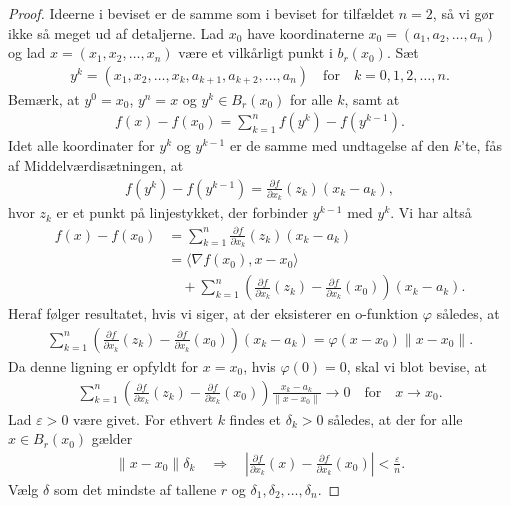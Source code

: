 \begin{proof}
  Ideerne i beviset er de samme som i beviset for tilfældet $n = 2$, så vi gør ikke så meget ud af detaljerne. Lad $x_0$ have koordinaterne $x_0 = (a_1, a_2, \ldots, a_n)$ og lad $x = (x_1, x_2, \ldots, x_n)$ være et vilkårligt punkt i $b_r(x_0)$. Sæt
  \begin{align*}
    y^k = (x_1, x_2, \ldots, x_k, a_{k + 1}, a_{k + 2}, \ldots, a_n)
    \quad \text{for} \quad k = 0, 1, 2, \ldots, n.
  \end{align*}
  Bemærk, at $y^0 = x_0$, $y^n = x$ og $y^k \in B_r(x_0)$ for alle $k$, samt at
  \begin{align*}
    f(x) - f(x_0) = \sum_{k = 1}^n f(y^k) - f(y^{k - 1}).
  \end{align*}
  Idet alle koordinater for $y^k$ og $y^{k - 1}$ er de samme med undtagelse af den $k$'te, fås af Middelværdisætningen, at
  \begin{align*}
    f(y^k) - f(y^{k - 1}) = \frac{\partial f}{\partial x_k}(z_k)(x_k - a_k),
  \end{align*}
  hvor $z_k$ er et punkt på linjestykket, der forbinder $y^{k - 1}$ med $y^k$. Vi har altså
  \begin{align*}
    f(x) - f(x_0) &= \sum_{k = 1}^n \frac{\partial f}{\partial x_k}(z_k)(x_k - a_k) \\
    &= \langle \nabla f(x_0), x - x_0 \rangle\\
    &\quad + \sum_{k = 1}^n \left( \frac{\partial f}{\partial x_k}(z_k) - \frac{\partial f}{\partial x_k}(x_0) \right) (x_k - a_k).
   \end{align*}
   Heraf følger resultatet, hvis vi siger, at der eksisterer en o-funktion $\varphi$ således, at
   \begin{align*}
     \sum_{k = 1}^n \left( \frac{\partial f}{\partial x_k}(z_k) - \frac{\partial f}{\partial x_k}(x_0) \right) (x_k - a_k) =
     \varphi(x - x_0) \| x -x_0 \|.
   \end{align*}
   Da denne ligning er opfyldt for $x = x_0$, hvis $\varphi(0) = 0$, skal vi blot bevise, at
   \begin{align*}
     \sum_{k = 1}^n \left( \frac{\partial f}{\partial x_k}(z_k) - \frac{\partial f}{\partial x_k}(x_0) \right) \frac{x_k - a_k}{\| x - x_0 \|} \rightarrow 0 \quad \text{for} \quad x \rightarrow x_0.
   \end{align*}
   Lad $\varepsilon > 0$ være givet. For ethvert $k$ findes et $\delta_k > 0$ således, at der for alle $x \in B_r(x_0)$ gælder
   \begin{align*}
     \| x - x_0 \| \delta_k \quad \Rightarrow \quad \left| \frac{\partial f}{\partial x_k}(x) - \frac{\partial f}{\partial x_k}(x_0) \right| < \frac{\varepsilon}{n}.
   \end{align*}
   Vælg $\delta$ som det mindste af tallene $r$ og $\delta_1, \delta_2, \ldots, \delta_n.$


\end{proof}

